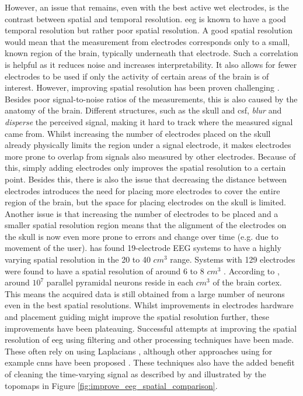 However, an issue that remains, even with the best active wet electrodes, is the contrast between spatial and temporal resolution.
\gls{eeg} is known to have a good temporal resolution but rather poor spatial resolution.
A good spatial resolution would mean that the measurement from electrodes corresponds only to a small, known region of the brain, typically underneath that electrode.
Such a correlation is helpful as it reduces noise and increases interpretability.
It also allows for fewer electrodes to be used if only the activity of certain areas of the brain is of interest.
However, improving spatial resolution has been proven challenging \citep{spatial_resolution}.
Besides poor signal-to-noise ratios of the measurements, this is also caused by the anatomy of the brain.
Different structures, such as the skull and \gls{csf}, \textit{blur} and \textit{disperse} the perceived signal, making it hard to track where the measured signal came from.
Whilst increasing the number of electrodes placed on the skull already physically limits the region under a signal electrode, it makes electrodes more prone to overlap from signals also measured by other electrodes.
Because of this, simply adding electrodes only improves the spatial resolution to a certain point.
Besides this, there is also the issue that decreasing the distance between electrodes introduces the need for placing more electrodes to cover the entire region of the brain, but the space for placing electrodes on the skull is limited.
Another issue is that increasing the number of electrodes to be placed and a smaller spatial resolution region means that the alignment of the electrodes on the skull is now even more prone to errors and change over time (e.g. due to movement of the user).
 has found 19-electrode EEG systems to have a highly varying spatial resolution in the 20 to 40 $cm^3$ range.
Systems with 129 electrodes were found to have a spatial resolution of around 6 to 8 $cm^3$ \citep{spatial_resolution}.
According to \citet{neurons_book}, around $10^7$ parallel pyramidal neurons reside in each $cm^3$ of the brain cortex.
This means the acquired data is still obtained from a large number of neurons even in the best spatial resolutions.
Whilst improvements in electrodes hardware and placement guiding might improve the spatial resolution further, these improvements have been plateauing.
Successful attempts at improving the spatial resolution of \gls{eeg} using filtering and other processing techniques have been made.
These often rely on using Laplacians \citep{improve_eeg_spatial_laplacian1, improve_eeg_spatial_laplacian2, improve_eeg_spatial_laplacian3}, although other approaches using for example \glspl{cnn} have been proposed \citep{improve_eeg_spatial_cnn}.
These techniques also have the added benefit of cleaning the time-varying signal as described by \citet{improve_eeg_spatial_comparison} and illustrated by the \glspl{topomap} in Figure \ref{fig:improve_eeg_spatial_comparison}.


